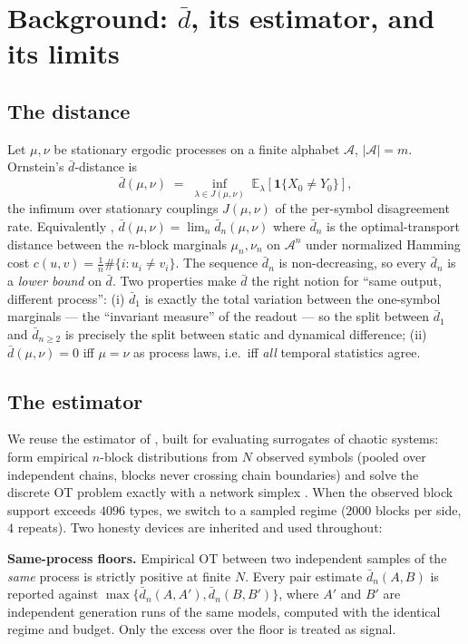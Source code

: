 \documentclass[11pt]{article}
\newcommand{\dbar}{\bar d}
\newcommand{\E}{\mathbb E}
\newcommand{\A}{\mathcal A}
\begin{document}
\section{Background: $\dbar$, its estimator, and its limits}\label{sec:background}

\subsection{The distance}
Let $\mu, \nu$ be stationary ergodic processes on a finite alphabet $\A$, $|\A| = m$.
Ornstein's $\dbar$-distance is
\begin{equation}
\dbar(\mu, \nu) \;=\; \inf_{\lambda \in J(\mu,\nu)} \;
\E_\lambda\!\left[\mathbf 1\{X_0 \neq Y_0\}\right],
\end{equation}
the infimum over stationary couplings $J(\mu,\nu)$ of the per-symbol disagreement
rate. Equivalently \citep{gray1975generalization},
$\dbar(\mu,\nu) = \lim_n \dbar_n(\mu,\nu)$ where $\dbar_n$ is the optimal-transport
distance between the $n$-block marginals $\mu_n, \nu_n$ on $\A^n$ under normalized
Hamming cost $c(u,v) = \frac1n \#\{i : u_i \neq v_i\}$. The sequence $\dbar_n$ is
non-decreasing, so every $\dbar_n$ is a \emph{lower bound} on $\dbar$. Two properties
make $\dbar$ the right notion for ``same output, different process'':
(i) $\dbar_1$ is exactly the total variation between the one-symbol marginals --- the
``invariant measure'' of the readout --- so the split between $\dbar_1$ and
$\dbar_{n\ge2}$ is precisely the split between static and dynamical difference;
(ii) $\dbar(\mu,\nu) = 0$ iff $\mu = \nu$ as process laws, i.e.\ iff \emph{all}
temporal statistics agree.

\subsection{The estimator}
We reuse the estimator of \citet{howe2026beyond}, built for evaluating surrogates of
chaotic systems: form empirical $n$-block distributions from $N$ observed symbols
(pooled over independent chains, blocks never crossing chain boundaries) and solve the
discrete OT problem exactly with a network simplex \citep{flamary2021pot}. When the
observed block support exceeds $4096$ types, we switch to a sampled regime ($2000$
blocks per side, $4$ repeats). Two honesty devices are inherited and used throughout:

\textbf{Same-process floors.} Empirical OT between two independent samples of the
\emph{same} process is strictly positive at finite $N$. Every pair estimate
$\dbar_n(A, B)$ is reported against $\max\{\dbar_n(A, A'), \dbar_n(B, B')\}$, where
$A'$ and $B'$ are independent generation runs of the same models, computed with the
identical regime and budget. Only the excess over the floor is treated as signal.
\end{document}
